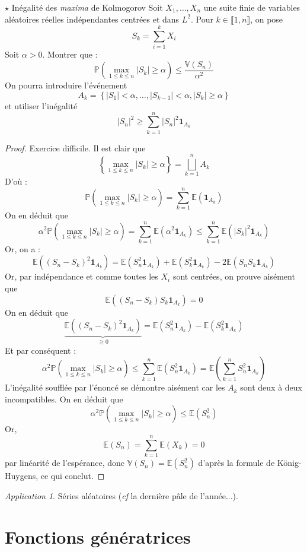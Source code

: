 \documentclass[french,a4paper]{article}
\renewcommand{\P}{\mathbb{P}}
\newcommand{\E}{\mathbb{E}}
\newcommand{\V}{\mathbb{V}}
\theoremstyle{plain}
\theoremstyle{definition}
\theoremstyle{remark}
\newtheorem*{app}{Application}
\begin{document}
\begin{ex}{$\star$ Inégalité des \textit{maxima} de Kolmogorov}
	Soit $X_1,\ldots,X_n$ une suite finie de variables aléatoires réelles indépendantes centrées et dans $L^2$. Pour $k\in\llbracket1,n\rrbracket$, on pose $$S_k=\sum_{i=1}^{k}X_i$$ Soit $\alpha>0$. Montrer que : $$\P\left(\underset{1\leqslant k\leqslant n}{\max}\lvert S_k\rvert\geqslant\alpha\right)\leqslant\frac{\V(S_n)}{\alpha^2}$$ On pourra introduire l'événement $$A_k=\left\{\lvert S_1\rvert <\alpha,\ldots,\lvert S_{k-1}\rvert<\alpha,\lvert S_k\rvert\geqslant\alpha\right\}$$ et utiliser l'inégalité $$\lvert S_n\rvert^2\geqslant\sum_{k=1}^{n}\lvert S_n\rvert^2\mathbf{1}_{A_k}$$
\end{ex}
\begin{proof}
	Exercice difficile. Il est clair que $$\left\{\underset{1\leqslant k\leqslant n}{\max}\lvert S_k\rvert\geqslant\alpha\right\}=\bigsqcup_{k=1}^nA_k$$ D'où : $$\P\left(\underset{1\leqslant k\leqslant n}{\max}\lvert S_k\rvert\geqslant\alpha\right)=\sum_{k=1}^{n}\E(\mathbf{1}_{A_k})$$ On en déduit que $$\alpha^2\P\left(\underset{1\leqslant k\leqslant n}{\max}\lvert S_k\rvert\geqslant\alpha\right)=\sum_{k=1}^{n}\E(\alpha^2\mathbf{1}_{A_k})\leqslant\sum_{k=1}^{n}\E(\lvert S_k\rvert^2\mathbf{1}_{A_k})$$ Or, on a : $$\E((S_n-S_k)^2\mathbf{1}_{A_k})=\E(S_n^2\mathbf{1}_{A_k})+\E(S_k^2\mathbf{1}_{A_k})-2\E(S_nS_k\mathbf{1}_{A_k})$$ Or, par indépendance et comme toutes les $X_i$ sont centrées, on prouve aisément que $$\E((S_n-S_k)S_k\mathbf{1}_{A_k})=0$$ On en déduit que $$\underbrace{\E((S_n-S_k)^2\mathbf{1}_{A_k})}_{\geqslant0}=\E(S_n^2\mathbf{1}_{A_k})-\E(S_k^2\mathbf{1}_{A_k})$$ Et par conséquent : $$\alpha^2\P\left(\underset{1\leqslant k\leqslant n}{\max}\lvert S_k\rvert\geqslant\alpha\right)\leqslant\sum_{k=1}^{n}\E(S_n^2\mathbf{1}_{A_k})=\E\left(\sum_{k=1}^{n}S_n^2\mathbf{1}_{A_k}\right)$$ L'inégalité soufflée par l'énoncé se démontre aisément car les $A_k$ sont deux à deux incompatibles. On en déduit que $$\alpha^2\P\left(\underset{1\leqslant k\leqslant n}{\max}\lvert S_k\rvert\geqslant\alpha\right)\leqslant\E(S_n^2)$$ Or, $$\E(S_n)=\sum_{k=1}^{n}\E(X_k)=0$$ par linéarité de l'espérance, donc $\V(S_n)=\E(S_n^2)$ d'après la formule de König-Huygens, ce qui conclut.
\end{proof}
\begin{app}
	Séries aléatoires (\textit{cf} la dernière pâle de l'année...).
\end{app}

\section{Fonctions génératrices}
\end{document}
